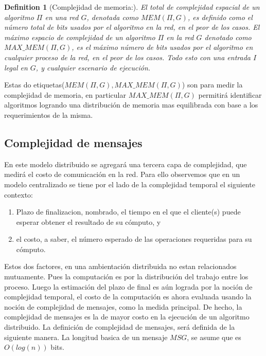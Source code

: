 \documentclass[10pt]{report}
\newtheorem{definition}{Definition}
\begin{document}
    \begin{definition}
        [Complejidad de memoria:] El total de complejidad espacial de un algoritmo $\Pi$ en una red $G$, denotada como
        $MEM(\Pi, G)$, es definido como el número total de bits usados por el algoritmo en la red, en el peor de los casos.
        El máximo espacio de complejidad de un algoritmo $\Pi$ en la red $G$ denotado como $MAX\_MEM(\Pi, G)$, es el máximo
        número de bits usados por el algoritmo en cualquier proceso de la red, en el peor de los casos.
        Todo esto con una entrada $I$ legal en $G$, y cualquier escenario de ejecución.
    \end{definition}

    Estas do etiquetas($MEM(\Pi,G),MAX\_MEM(\Pi,G)$) son para medir la complejidad de memoria, en particular $MAX\_MEM(\Pi, G)$ permitirá identificar algoritmos
    logrando una distribución de memoria mas equilibrada con base a los requerimientos de la misma.

    \subsection{Complejidad de mensajes}\label{subsec:complejidad-de-mensajes}
    En este modelo distribuido se agregará una tercera capa de complejidad, que medirá el costo de comunicación en la red.
    Para ello observemos que en un modelo centralizado se tiene por el lado de la complejidad temporal el siguiente contexto:\newline
    \begin{enumerate}
        \item Plazo de finalizacion, nombrado, el tiempo en el que el cliente(s) puede esperar obtener el resultado de su cómputo, y
        \item el costo, a saber, el número esperado de las operaciones requeridas para su cómputo.
    \end{enumerate}
    Estos dos factores, en una ambientación distribuida no estan relacionados mutuamente.
    Pues la computación es por la distribución del trabajo entre los proceso.
    Luego la estimación del plazo de final es aún lograda por la noción de complejidad temporal,
    el costo de la computación es ahora evaluada usando la noción de complejidad de mensajes, como la medida principal.\newline
    De hecho, la complejidad de mensajes es la de mayor costo en la ejecución de un algoritmo distribuido.
    \newline
    La definición de complejidad de mensajes, será definida de la siguiente manera.\newline
    La longitud basica de un mensaje $MSG$, se asume que es $O(log(n))$ bits.
\end{document}
